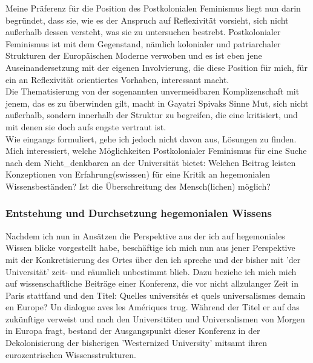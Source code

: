 \noindent Meine Präferenz für die Position des Postkolonialen Feminismus liegt nun darin
begründet, dass sie, wie es der Anspruch auf Reflexivität vorsieht, sich nicht
außerhalb dessen versteht, was sie zu untersuchen bestrebt. Postkolonialer
Feminismus ist mit dem Gegenstand, nämlich kolonialer und patriarchaler
Strukturen der Europäischen Moderne verwoben und es ist eben jene
Auseinandersetzung mit der eigenen Involvierung, die diese Position für mich,
für ein an Reflexivität orientiertes Vorhaben, interessant macht. \\
Die
Thematisierung von der sogenannten unvermeidbaren Komplizenschaft mit jenem,
das es zu überwinden gilt, macht in Gayatri Spivaks Sinne Mut, sich nicht
außerhalb, sondern innerhalb der Struktur zu begreifen, die eine kritisiert,
und mit denen sie doch \glqq aufs engste vertraut ist. \grqq \footnotemark 
{}\\

\noindent Wie eingangs formuliert, gehe ich jedoch nicht davon aus, Lösungen zu finden.
Mich interessiert, welche Möglichkeiten Postkolonialer Feminismus für eine
Suche nach dem Nicht\_denkbaren an der Universität bietet: Welchen Beitrag
leisten Konzeptionen von Erfahrung(swisssen) für eine Kritik an hegemonialen
Wissensbeständen? Ist die Überschreitung des Mensch(lichen) möglich?

\subsubsection{Entstehung und Durchsetzung hegemonialen Wissens}

Nachdem ich nun in Ansätzen die Perspektive aus der ich auf hegemoniales Wissen
blicke vorgestellt habe, beschäftige ich mich nun aus jener Perspektive mit der
Konkretisierung des Ortes über den ich spreche und der bisher mit 'der
Universität' zeit- und räumlich unbestimmt blieb. Dazu beziehe ich mich mich
auf wissenschaftliche Beiträge einer Konferenz, die vor nicht allzulanger Zeit
in Paris stattfand und den Titel: \glqq Quelles universités et quels
universalismes demain en Europe? Un dialogue aves les Amériques \grqq
\footnotemark {} trug. Während der Titel er auf das zukünftige
verweist und nach den Universitäten und Universalismen von Morgen in Europa
fragt, bestand der Ausgangspunkt dieser Konferenz in der Dekolonisierung der
bisherigen 'Westernized University' mitsamt ihren eurozentrischen
Wissensstrukturen.\\ 

